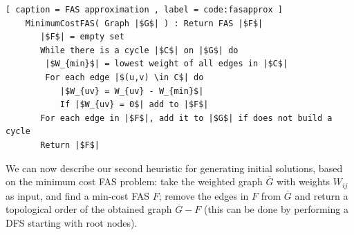 \begin{lstlisting}[ caption = FAS approximation , label = code:fasapprox ]
	MinimumCostFAS( Graph |$G$| ) : Return FAS |$F$|
	   |$F$| = empty set
	   While there is a cycle |$C$| on |$G$| do
	   	|$W_{min}$| = lowest weight of all edges in |$C$|
		For each edge |$(u,v) \in C$| do
		   |$W_{uv} = W_{uv} - W_{min}$|
		   If |$W_{uv} = 0$| add to |$F$|
	   For each edge in |$F$|, add it to |$G$| if does not build a cycle
	   Return |$F$|
\end{lstlisting}

We can now describe our second heuristic for generating initial solutions, based on the minimum cost FAS problem: take the weighted graph $\overline G$ with weights $W_{ij}$ as input, and find a min-cost FAS $F$; remove the edges in $F$ from $\overline G$ and return a topological order of the obtained graph $\overline G - F$ (this can be done by performing a DFS starting with root nodes).

